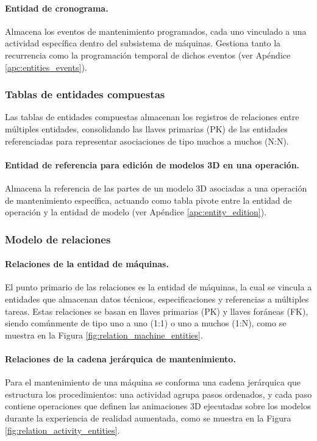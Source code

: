             \paragraph{Entidad de cronograma.} Almacena los eventos de mantenimiento programados, cada uno vinculado a una actividad específica dentro del subsistema de máquinas. Gestiona tanto la recurrencia como la programación temporal de dichos eventos (ver Apéndice \ref{apc:entities_events}).

        \subsubsection{Tablas de entidades compuestas}

            Las tablas de entidades compuestas almacenan los registros de relaciones entre múltiples entidades, consolidando las llaves primarias (PK) de las entidades referenciadas para representar asociaciones de tipo muchos a muchos (N:N).

            \paragraph{Entidad de referencia para edición de modelos 3D en una operación.} Almacena la referencia de las partes de un modelo 3D asociadas a una operación de mantenimiento específica, actuando como tabla pivote entre la entidad de operación y la entidad de modelo (ver Apéndice \ref{apc:entity_edition}).

        \subsubsection{Modelo de relaciones}

            \paragraph{Relaciones de la entidad de máquinas.} El punto primario de las relaciones es la entidad de máquinas, la cual se vincula a entidades que almacenan datos técnicos, especificaciones y referencias a múltiples tareas. Estas relaciones se basan en llaves primarias (PK) y llaves foráneas (FK), siendo comúnmente de tipo uno a uno (1:1) o uno a muchos (1:N), como se muestra en la Figura \ref{fig:relation_machine_entities}.

            

            \paragraph{Relaciones de la cadena jerárquica de mantenimiento.} Para el mantenimiento de una máquina se conforma una cadena jerárquica que estructura los procedimientos: una actividad agrupa pasos ordenados, y cada paso contiene operaciones que definen las animaciones 3D ejecutadas sobre los modelos durante la experiencia de realidad aumentada, como se muestra en la Figura \ref{fig:relation_activity_entities}.

